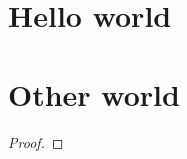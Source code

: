 \documentclass{article}
\renewcommand{\appendixprelim}{\par\noindent\hrulefill\par}
\begin{document}
\tableofcontents
\pagestyle{fancy} %
\appendixprelim
\section{Hello world}
\lipsum[6]
\begin{thmrep}
  \lipsum[5]
\end{thmrep}
\section{Other  world}
\lipsum[4]
\begin{thmrep}
\lipsum[3]
\end{thmrep}
\begin{thmrep}
\lipsum[2]
\end{thmrep}
\begin{proof}
\lipsum[1]
\end{proof}
\end{document}
